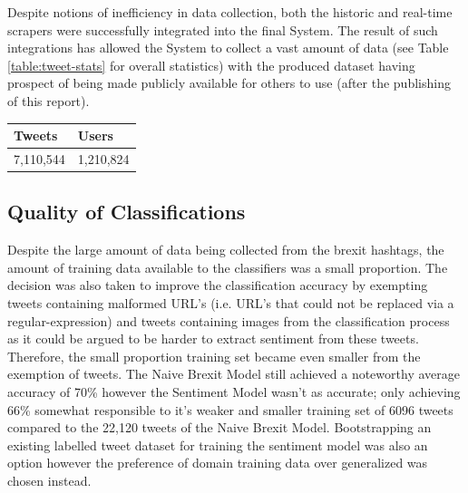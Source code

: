 \documentclass[11pt]{report}
\begin{document}
Despite notions of inefficiency in data collection, both the historic and real-time scrapers were successfully integrated into the final System. The result of such integrations has allowed the System to collect a vast amount of data (see Table \ref{table:tweet-stats} for overall statistics) with the produced dataset having prospect of being made publicly available for others to use (after the publishing of this report).
\\
\vspace{-0.5cm}
\enlargethispage{\baselineskip}

\begin{center}
\begin{tabular}{ |p{2cm}||p{2cm}|}
 \hline
 Tweets & Users\\
 \hline
 7,110,544 & 1,210,824 \\
 \hline
\end{tabular}
\label{table:tweet-stats}
\end{center}
\clearpage

\subsection*{Quality of Classifications}

Despite the large amount of data being collected from the brexit hashtags, the amount of training data available to the classifiers was a small proportion. The decision was also taken to improve the classification accuracy by exempting tweets containing malformed URL's (i.e. URL's that could not be replaced via a regular-expression) and tweets containing images from the classification process as it could be argued to be harder to extract sentiment from these tweets. Therefore, the small proportion training set became even smaller from the exemption of tweets. The Naive Brexit Model still achieved a noteworthy average accuracy of 70\% however the Sentiment Model wasn't as accurate; only achieving 66\% somewhat responsible to it's weaker and smaller training set of 6096 tweets compared to the 22,120 tweets of the Naive Brexit Model. Bootstrapping an existing labelled tweet dataset for training the sentiment model was also an option however the preference of domain training data over generalized was chosen instead. 
\\
\end{document}
